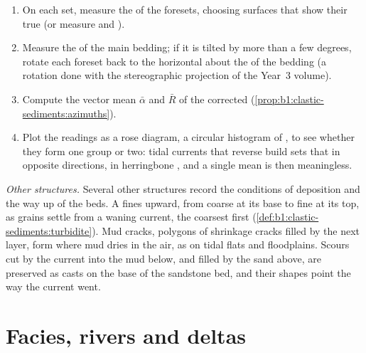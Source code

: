 \begin{method}\label{met:b1:clastic-sediments:palaeocurrent}
\begin{enumerate}
  \item On each set, measure the  of the foresets, choosing
        surfaces that show their true  (or measure  and ).
  \item Measure the  of the main bedding; if it is tilted by more than a
        few degrees, rotate each foreset back to the horizontal about the 
        of the bedding (a rotation done with the stereographic projection of the Year~3 volume).
  \item Compute the vector mean $\bar\alpha$ and $\bar R$ of the corrected  (\cref{prop:b1:clastic-sediments:azimuths}).
  \item Plot the readings as a rose diagram, a circular histogram of ,
        to see whether they form one group or two: tidal currents that reverse
        build sets that  in opposite directions, in herringbone
        , and a single mean is then meaningless.
\end{enumerate}
\end{method}

\emph{Other structures.} Several other structures record the conditions of
deposition and the way up of the beds. A  fines upward, from coarse at
its base to fine at its top, as grains settle from a waning current, the
coarsest first (\cref{def:b1:clastic-sediments:turbidite}). Mud cracks, polygons
of shrinkage cracks filled by the next layer, form where mud dries in the air,
as on tidal flats and floodplains. Scours cut by the current into the mud
below, and filled by the sand above, are preserved as casts on the base of the
sandstone bed, and their shapes point the way the current went.

\section{Facies, rivers and deltas}\label{sec:b1:clastic-sediments:rivers-deltas}

